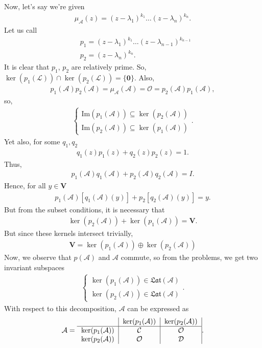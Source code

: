 \documentclass{book}
\theoremstyle{definition}
\newcommand{\V}{\mathbf{V}}
\newcommand{\A}{\mathcal{A}}
\newcommand{\lag}{\mathcal{L}}
\newcommand{\ima}{\text{Im}}
\begin{document}
Now, let's say we're given 
\begin{align*}
\mu_\A(z) = (z-\lambda_1)^{k_1} \dots (z - \lambda_n)^{k_n}.
\end{align*}
Let us call
\begin{align*}
&p_1 = (z-\lambda_1)^{k_1} \dots (z - \lambda_{n-1})^{k_{n-1}}\\
&p_2 = (z - \lambda_n)^{k_n}.
\end{align*}
It is clear that $p_1$, $p_2$ are relatively prime. So, $\ker(p_1(\lag)) \cap \ker(p_2(\lag)) = \{ \mathbf{0} \}$. Also,
\begin{align*}
p_1(\A)p_2(\A) = \mu_\A(\A) = \mathcal{O} = p_2(\A)p_1(\A),
\end{align*}
so,
\begin{align*}\label{im}
\begin{cases}
\ima(p_1(\A)) \subseteq \ker(p_2(\A))\\
\ima(p_2(\A)) \subseteq \ker(p_1(\A))
\end{cases}.
\end{align*}
Yet also, for some $q_1, q_2$
\begin{align*}
q_1(z)p_1(z) + q_2(z)p_2(z) = 1.
\end{align*}
Thus,
\begin{align*}
p_1(\A)q_1(\A) + p_2(\A)q_2(\A) = I.
\end{align*}
Hence, for all $y\in \V$
\begin{align*}
p_1(\A)[q_1(\A)(y)] + p_2[q_2(\A)(y)] = y.
\end{align*}
But from the subset conditions, it is necessary that
\begin{align*}
\ker(p_2(\A)) + \ker(p_1(\A)) = \V.
\end{align*}
But since these kernels intersect trivially, 
\begin{align*}
\boxed{\V = \ker(p_1(\A)) \oplus \ker(p_2(\A))}
\end{align*}
Now, we observe that $p(\A)$ and $\A$ commute, so from the problems, we get two invariant subspaces
\begin{align*}
\begin{cases}
\ker(p_1(\A)) \in \mathfrak{Lat}(\A)\\
\ker(p_2(\A)) \in \mathfrak{Lat}(\A)
\end{cases}.
\end{align*}
With respect to this decomposition, $\A$ can be expressed as
\begin{align*}
\A = \begin{tabular}{c|c|c|}
& $\ker(p_1(\A))$ & $\ker(p_2(\A))$\\
\hline
$\ker(p_1(\A))$& $\mathcal{C}$ & $\mathcal{O}$ \\	
$\ker(p_2(\A))$& $\mathcal{O}$ & $\mathcal{D}$ 
\end{tabular}.
\end{align*}
\end{document}
